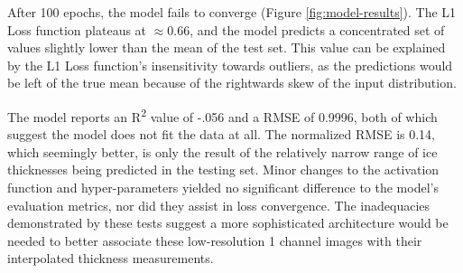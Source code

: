 After 100 epochs, the model fails to converge (Figure \ref{fig:model-results}). The L1 Loss function plateaus at $\approx0.66$, and the model predicts a concentrated set of values slightly lower than the mean of the test set. This value can be explained by the L1 Loss function's insensitivity towards outliers, as the predictions would be left of the true mean because of the rightwards skew of the input distribution.

The model reports an R\textsuperscript{2} value of -.056 and a RMSE of 0.9996, both of which suggest the model does not fit the data at all. The normalized RMSE is 0.14, which seemingly better, is only the result of the relatively narrow range of ice thicknesses being predicted in the testing set. Minor changes to the activation function and hyper-parameters yielded no significant difference to the model's evaluation metrics, nor did they assist in loss convergence. The inadequacies demonstrated by these tests suggest a more sophisticated architecture would be needed to better associate these low-resolution 1 channel images with their interpolated thickness measurements.

